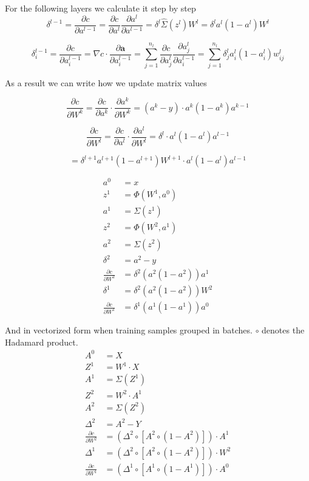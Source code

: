 \documentclass[draft]{article}
\begin{document}
For the following layers we calculate it step by step
\[
\delta^{l-1} = \frac{\partial c}{\partial a^{l-1}} = \frac{\partial c}{\partial a^l} \frac{\partial a^l}{\partial a^{l-1}} = \delta^l \hat\Sigma(z^l)W^l = \delta^l a^l(1-a^l)W^l
\]

\[
\delta_i^{l-1} = \frac{\partial c}{\partial a_i^{l-1}} = \nabla c \cdot \frac{\partial \mathbf{a}}{\partial a_i^{l-1}} = \sum_{j=1}^{n_l} \frac{\partial c}{\partial a_j^l} \frac{\partial a_j^l}{\partial a_i^{l-1}} = \sum_{j=1}^{n_l} \delta_j^l a_i^l(1-a_i^l)w_{ij}^l
\]

As a result we can write how we update matrix values

\[
\frac{\partial c}{\partial W^k} = \frac{\partial c}{\partial a^k} \cdot \frac{\partial a^k}{\partial W^k} = (a^k - y) \cdot a^k(1 - a^k) a^{k-1}
\]

\[
\frac{\partial c}{\partial W^{l}} = \frac{\partial c}{\partial a^{l}} \cdot \frac{\partial a^{l}}{\partial W^{l}} = \delta^{l} \cdot a^l(1 - a^l) a^{l-1}
\]

\[
 = \delta^{l+1} a^{l+1}(1-a^{l+1})W^{l+1} \cdot a^l(1 - a^l) a^{l-1}
\]

\begin{align}
a^0 &= x \\
z^1 &= \Phi(W^1, a^0) \\
a^1 &= \Sigma(z^1) \\
z^2 &= \Phi(W^2, a^1) \\
a^2 &= \Sigma(z^2) \\
\delta^2 &= a^2 - y \\
\frac{\partial c}{\partial W^2} &= \delta^2 (a^2 (1-a^2) ) a^1 \\
\delta^1 &= \delta^2 (a^2 (1-a^2 )) W^2 \\
\frac{\partial c}{\partial W^1} &= \delta^1 (a^1 (1-a^1) ) a^0
\end{align}

And in vectorized form when training samples grouped in batches. $\circ$ denotes the Hadamard product.
\begin{align}
A^0 &= X \\
Z^1 &= W^1 \cdot X \\
A^1 &= \Sigma(Z^1) \\
Z^2 &= W^2 \cdot A^1 \\
A^2 &= \Sigma(Z^2) \\
\Delta^2 &= A^2 - Y \\
\frac{\partial c}{\partial W^2} &= (\Delta^2 \circ [A^2 \circ (1-A^2) ] ) \cdot A^1 \\
\Delta^1 &= (\Delta^2 \circ [A^2 \circ (1-A^2 )] ) \cdot W^2 \\
\frac{\partial c}{\partial W^1} &= (\Delta^1 \circ [A^1 \circ (1-A^1) ] ) \cdot A^0
\end{align}
  
\end{document}
